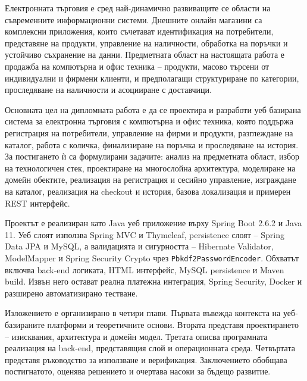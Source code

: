 Електронната търговия е сред най-динамично развиващите се области на съвременните информационни системи. Днешните онлайн магазини са комплексни приложения, които съчетават идентификация на потребители, представяне на продукти, управление на наличности, обработка на поръчки и устойчиво съхранение на данни. Предметната област на настоящата работа е продажба на компютърна и офис техника -- продукти, масово търсени от индивидуални и фирмени клиенти, и предполагащи структуриране по категории, проследяване на наличности и асоцииране с доставчици.

Основната цел на дипломната работа е да се проектира и разработи уеб базирана система за електронна търговия с компютърна и офис техника, която поддържа регистрация на потребители, управление на фирми и продукти, разглеждане на каталог, работа с количка, финализиране на поръчка и проследяване на история. За постигането ѝ са формулирани задачите: анализ на предметната област, избор на технологичен стек, проектиране на многослойна архитектура, моделиране на домейн обектите, реализация на регистрация и сесийно управление, изграждане на каталог, реализация на checkout и история, базова локализация и примерен REST интерфейс.

Проектът е реализиран като Java уеб приложение върху Spring Boot 2.6.2 и Java 11. Уеб слоят използва Spring MVC и Thymeleaf, persistence слоят -- Spring Data JPA и MySQL, а валидацията и сигурността -- Hibernate Validator, ModelMapper и Spring Security Crypto чрез \texttt{Pbkdf2PasswordEncoder}. Обхватът включва back-end логиката, HTML интерфейс, MySQL persistence и Maven build. Извън него остават реална платежна интеграция, Spring Security, Docker и разширено автоматизирано тестване.

Изложението е организирано в четири глави. Първата въвежда контекста на уеб-базираните платформи и теоретичните основи. Втората представя проектирането -- изисквания, архитектура и домейн модел. Третата описва програмната реализация на back-end, представящия слой и операционната среда. Четвъртата представя ръководство за използване и верификация. Заключението обобщава постигнатото, оценява решението и очертава насоки за бъдещо развитие.
